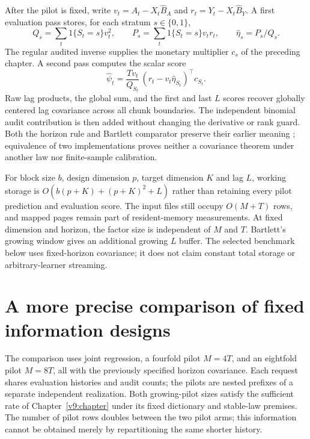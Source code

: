 After the pilot is fixed, write $v_t=A_t-X_t\widehat B_A$ and
$r_t=Y_t-X_t\widehat B_Y$. A first evaluation pass stores, for each stratum
$s\in\{0,1\}$,
\begin{equation}
 Q_s=\sum_t1\{S_t=s\}v_t^2,\qquad
 P_s=\sum_t1\{S_t=s\}v_t r_t,\qquad
 \widehat\eta_s=P_s/Q_s.
\end{equation}
The regular audited inverse supplies the monetary multiplier $c_s$ of the
preceding chapter. A second pass computes the scalar score
\begin{equation}
 \widehat\psi_t=
 \frac{T v_t}{Q_{S_t}}\,(r_t-v_t\widehat\eta_{S_t})^\top c_{S_t}.
\end{equation}
Raw lag products, the global sum, and the first and last $L$ scores recover
globally centered lag covariance across all chunk boundaries. The independent
binomial audit contribution is then added without changing the derivative or
rank guard. Both the horizon rule and Bartlett comparator preserve their
earlier meaning \citep{newey1986}; equivalence of two implementations proves
neither a covariance theorem under another law nor finite-sample calibration.

For block size $b$, design dimension $p$, target dimension $K$ and lag $L$,
working storage is $O(b(p+K)+(p+K)^2+L)$ rather than retaining every pilot
prediction and evaluation score. The input files still occupy $O(M+T)$ rows,
and mapped pages remain part of resident-memory measurements. At fixed
dimension and horizon, the factor size is independent of $M$ and $T$.
Bartlett's growing window gives an additional growing $L$ buffer. The selected
benchmark below uses fixed-horizon covariance; it does not claim constant
total storage or arbitrary-learner streaming.

\section{A more precise comparison of fixed information designs}
\label{v10:precision}

The comparison uses joint regression, a fourfold pilot $M=4T$, and an eightfold
pilot $M=8T$, all with the previously specified horizon covariance. Each
request shares evaluation histories and audit counts; the pilots are nested
prefixes of a separate independent realization. Both growing-pilot sizes
satisfy the sufficient rate of Chapter~\ref{v9:chapter} under its fixed
dictionary and stable-law premises. The number of pilot rows doubles between
the two pilot arms; this information cannot be obtained merely by repartitioning
the same shorter history.

